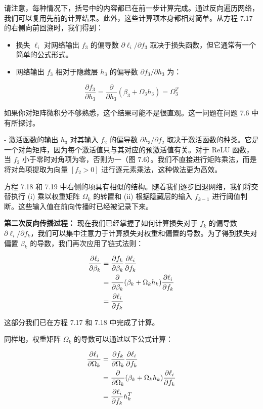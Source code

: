 请注意，每种情况下，括号中的内容都已在前一步计算完成。通过反向遍历网络，我们可以复用先前的计算结果。此外，这些计算项本身都相对简单。从方程 7.17 的右侧向前回溯时，我们得到：
\begin{itemize}
    \item 损失 \(\ell_i\) 对网络输出 \(f_3\) 的偏导数 \(\partial \ell_i/\partial f_3\) 取决于损失函数，但它通常有一个简单的公式形式。
    \item 网络输出 \(f_3\) 相对于隐藏层 \(h_3\) 的偏导数 \(\partial f_3/\partial h_3\) 为：
\end{itemize}


\begin{equation}
\frac{\partial f_3}{\partial h_3} = \frac{\partial}{\partial h_3} (\beta_3 + \Omega_3 h_3) = \Omega_3^T  
\end{equation}

如果你对矩阵微积分不够熟悉，这个结果可能不是很直观。这一问题在问题 7.6 中有所探讨。

- 激活函数的输出 \(h_3\) 对其输入 \(f_2\) 的偏导数 \(\partial h_3/\partial f_2\) 取决于激活函数的种类。它是一个对角矩阵，因为每个激活值只与其对应的预激活值有关。对于 ReLU 函数，当 \(f_2\) 小于零时对角项为零，否则为一（图 7.6）。我们不直接进行矩阵乘法，而是将对角项提取为向量 \([f_2 > 0]\) 进行逐元素乘法，这种做法更为高效。

方程 7.18 和 7.19 中右侧的项具有相似的结构。随着我们逐步回退网络，我们将交替执行 (i) 乘以权重矩阵 \(\Omega_k\) 的转置和 (ii) 根据隐藏层的输入 \(f_{k-1}\) 进行阈值判断。这些输入值在前向传播时已经被记录下来。


\textbf{第二次反向传播过程：} 现在我们已经掌握了如何计算损失对于 \(f_k\) 的偏导数 \(\partial \ell_i/\partial f_k\)，我们可以集中注意力于计算损失对权重和偏置的导数。为了得到损失对偏置 \(\beta_k\) 的导数，我们再次应用了链式法则：


\begin{align}
\frac{\partial \ell_i}{\partial \beta_k} &= \frac{\partial f_k}{\partial \beta_k} \frac{\partial \ell_i}{\partial f_k} \notag \\
&= \frac{\partial}{\partial \beta_k} (\beta_k + \Omega_k h_k) \frac{\partial \ell_i}{\partial f_k} \notag \\
&= \frac{\partial \ell_i}{\partial f_k} 
\end{align}


这部分我们已在方程 7.17 和 7.18 中完成了计算。

同样地，权重矩阵 \(\Omega_k\) 的导数可以通过以下公式计算：


\begin{align}
\frac{\partial \ell_i}{\partial \Omega_k} &= \frac{\partial f_k}{\partial \Omega_k} \frac{\partial \ell_i}{\partial f_k} \notag \\
&= \frac{\partial}{\partial \Omega_k} (\beta_k + \Omega_k h_k) \frac{\partial \ell_i}{\partial f_k} \notag \\
&= \frac{\partial \ell_i}{\partial f_k} h_k^T 
\end{align}



